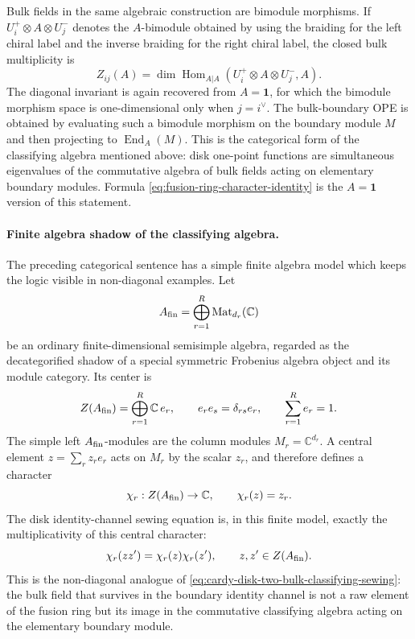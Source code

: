Bulk fields in the same algebraic construction are bimodule morphisms.  If
\(U_i^+\otimes A\otimes U_j^-\) denotes the \(A\)-bimodule obtained by using
the braiding for the left chiral label and the inverse braiding for the
right chiral label, the closed bulk multiplicity is
\begin{equation}
  Z_{ij}(A)
  =
  \dim
  \operatorname{Hom}_{A|A}
  (U_i^+\otimes A\otimes U_j^-,A).
  \label{eq:bcft-frobenius-bulk-multiplicity}
\end{equation}
The diagonal invariant is again recovered from \(A=\mathbf 1\), for which
the bimodule morphism space is one-dimensional only when \(j=i^\vee\).  The
bulk-boundary OPE is obtained by evaluating such a bimodule morphism on the
boundary module \(M\) and then projecting to
\(\operatorname{End}_{A}(M)\).  This is the categorical form of the
classifying algebra mentioned above: disk one-point functions are
simultaneous eigenvalues of the commutative algebra of bulk fields acting on
elementary boundary modules.  Formula
\eqref{eq:fusion-ring-character-identity} is the \(A=\mathbf 1\) version of
this statement.

\paragraph{Finite algebra shadow of the classifying algebra.}
The preceding categorical sentence has a simple finite algebra model which
keeps the logic visible in non-diagonal examples.  Let
\[
  A_{\rm fin}=\bigoplus_{r=1}^{R}\operatorname{Mat}_{d_r}(\mathbb C)
\]
be an ordinary finite-dimensional semisimple algebra, regarded as the
decategorified shadow of a special symmetric Frobenius algebra object and
its module category.  Its center is
\[
  Z(A_{\rm fin})
  =
  \bigoplus_{r=1}^{R}\mathbb C\,e_r ,
  \qquad
  e_r e_s=\delta_{rs}e_r,\qquad
  \sum_{r=1}^{R}e_r=1 .
\]
The simple left \(A_{\rm fin}\)-modules are the column modules
\(M_r=\mathbb C^{d_r}\).  A central element
\(z=\sum_r z_r e_r\) acts on \(M_r\) by the scalar \(z_r\), and therefore
defines a character
\begin{equation}
  \chi_r:Z(A_{\rm fin})\to\mathbb C,\qquad
  \chi_r(z)=z_r .
  \label{eq:bcft-finite-center-character}
\end{equation}
The disk identity-channel sewing equation is, in this finite model, exactly
the multiplicativity of this central character:
\begin{equation}
  \chi_r(zz')=\chi_r(z)\chi_r(z'),
  \qquad z,z'\in Z(A_{\rm fin}) .
  \label{eq:bcft-finite-center-character-sewing}
\end{equation}
This is the non-diagonal analogue of
\eqref{eq:cardy-disk-two-bulk-classifying-sewing}: the bulk field that
survives in the boundary identity channel is not a raw element of the
fusion ring but its image in the commutative classifying algebra acting on
the elementary boundary module.

